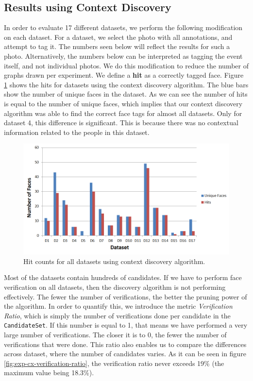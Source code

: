 \subsection{Results using Context Discovery}
In order to evaluate 17 different datasets, we perform the following modification on each dataset. For a dataset, we select the photo with all annotations, and attempt to tag it. The numbers seen below will reflect the results for such a photo. Alternatively, the numbers below can be interpreted as tagging the event itself, and not individual photos. We do this modification to reduce the number of graphs drawn per experiment. We define a \textbf{hit} as a correctly tagged face. Figure \ref{fig:exp-cx-hits} shows the hits for datasets using the context discovery algorithm. The blue bars show the number of unique faces in the dataset. As we can see the number of hits is equal to the number of unique faces, which implies that our context discovery algorithm was able to find the correct face tags for almost all datasets. Only for dataset 4, this difference is significant. This is because there was no contextual information related to the people in this dataset.

\begin{figure}[t]
\centering
\includegraphics[width=\textwidth]{media/chapter5/axis/cx-unique-faces-hits-all-datasets.png}
\caption{Hit counts for all datasets using context discovery algorithm.}
\label{fig:exp-cx-hits}
\end{figure}

Most of the datasets contain hundreds of candidates. If we have to perform face verification on all datasets, then the discovery algorithm is not performing effectively. The fewer the number of verifications, the better the pruning power of the algorithm. In order to quantify this, we introduce the metric \textit{Verification Ratio}, which is simply the number of verifications done per candidate in the \texttt{CandidateSet}. If this number is equal to 1, that means we have performed a very large number of verifications. The closer it is to 0, the fewer the number of verifications that were done. This ratio also enables us to compare the differences across dataset, where the number of candidates varies. As it can be seen in figure \ref{fig:exp-cx-verification-ratio}, the verification ratio never exceeds 19\% (the maximum value being 18.3\%).

